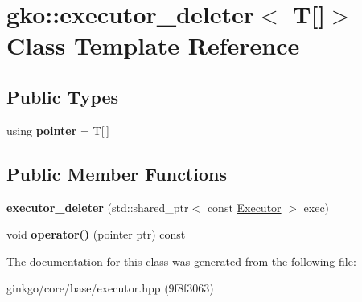 \hypertarget{classgko_1_1executor__deleter_3_01T[]_4}{}\section{gko\+:\+:executor\+\_\+deleter$<$ T\mbox{[}\mbox{]}$>$ Class Template Reference}
\label{classgko_1_1executor__deleter_3_01T[]_4}
\subsection*{Public Types}
\begin{DoxyCompactItemize}
\item 
\mbox{\label{classgko_1_1executor__deleter_3_01T[]_4_ad28bfaa2f1d909bc11117a4889581a02}} 
using {\bfseries pointer} = T\mbox{[}$\,$\mbox{]}
\end{DoxyCompactItemize}
\subsection*{Public Member Functions}
\begin{DoxyCompactItemize}
\item 
\mbox{\label{classgko_1_1executor__deleter_3_01T[]_4_ab60279758e90bdcd14b076c55813d5be}} 
{\bfseries executor\+\_\+deleter} (std\+::shared\+\_\+ptr$<$ const \hyperlink{classgko_1_1Executor}{Executor} $>$ exec)
\item 
\mbox{\label{classgko_1_1executor__deleter_3_01T[]_4_a83f935eea2ed81964c8a018964c96934}} 
void {\bfseries operator()} (pointer ptr) const
\end{DoxyCompactItemize}


The documentation for this class was generated from the following file\+:\begin{DoxyCompactItemize}
\item 
ginkgo/core/base/executor.\+hpp (9f8f3063)\end{DoxyCompactItemize}
